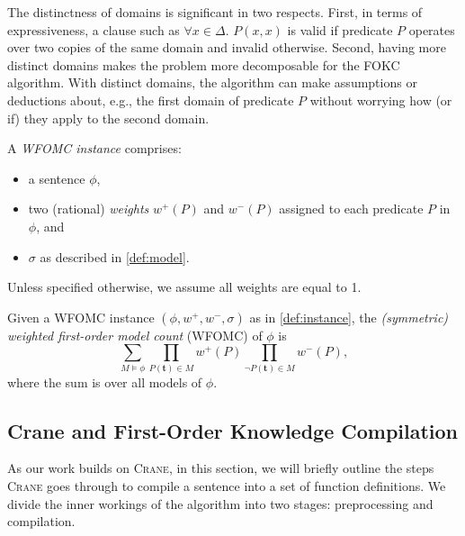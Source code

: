\documentclass[a4paper,UKenglish,cleveref,autoref,thm-restate]{lipics-v2021}
\begin{document}
\begin{remark*}
  The distinctness of domains is significant in two respects. First, in terms of
  expressiveness, a clause such as $\forall x \in \Delta\text{. }P(x, x)$ is
  valid if predicate $P$ operates over two copies of the same domain and invalid
  otherwise. Second, having more distinct domains makes the problem more
  decomposable for the FOKC algorithm. With distinct domains, the algorithm can
  make assumptions or deductions about, e.g., the first domain of predicate $P$
  without worrying how (or if) they apply to the second domain.
\end{remark*}

\begin{definition}\label{def:instance}
  A \emph{WFOMC instance} comprises:
  \begin{itemize}
    \item a sentence $\phi$,
    \item two (rational) \emph{weights} $w^{+}(P)$ and $w^{-}(P)$ assigned to
          each predicate $P$ in $\phi$, and
    \item $\sigma$ as described in \cref{def:model}.
  \end{itemize}
  Unless specified otherwise, we assume all weights are equal to 1.
\end{definition}

\begin{definition}
  Given a WFOMC instance $(\phi, w^{+}, w^{-}, \sigma)$ as in
  \cref{def:instance}, the \emph{(symmetric) weighted first-order model count}
  (WFOMC) of $\phi$ is
  \begin{equation}\label{eq:wfomc}
    \sum_{M \models \phi} \prod_{P(\mathbf{t}) \in M} w^{+}(P) \prod_{\neg P(\mathbf{t}) \in M} w^{-}(P),
  \end{equation}
  where the sum is over all models of $\phi$.
\end{definition}

\subsection{Crane and First-Order Knowledge Compilation}\label{sec:crane}

As our work builds on \textsc{Crane}, in this section, we will briefly outline
the steps \textsc{Crane} goes through to compile a sentence into a set of
function definitions. We divide the inner workings of the algorithm into two
stages: preprocessing and compilation.
\end{document}
